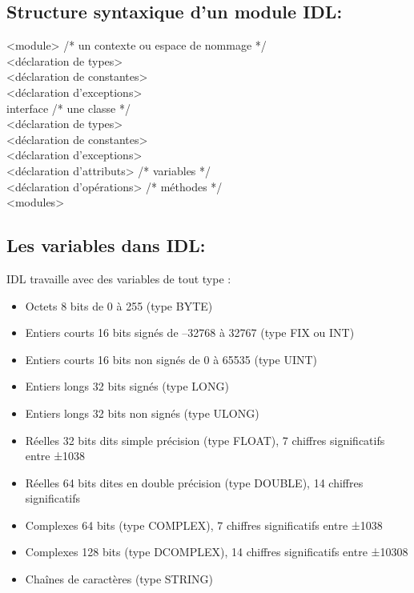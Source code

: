    \subsection{Structure syntaxique d'un module IDL:}

   <module> /* un contexte ou espace de nommage */\\

   <déclaration de types>\\
   <déclaration de constantes>\\
   <déclaration d'exceptions>\\

   interface /* une classe */\\
   <déclaration de types>\\
   <déclaration de constantes>\\
   <déclaration d'exceptions>\\

   <déclaration d'attributs> /* variables */\\
   <déclaration d'opérations> /* méthodes */\\
   <modules>\\


   \subsection{Les variables dans IDL:}
   IDL travaille avec des variables de tout type :
   \begin{itemize}[label=$\bullet$]
   \item Octets 8 bits de 0 à 255 (type BYTE)
   \item Entiers courts 16 bits signés de –32768 à 32767 (type FIX ou INT)
   \item Entiers courts 16 bits non signés de 0 à 65535 (type UINT)
   \item Entiers longs 32 bits signés (type LONG)
   \item Entiers longs 32 bits non signés (type ULONG)
   \item Réelles 32 bits dits simple précision (type FLOAT), 7 chiffres significatifs entre ±1038
   \item Réelles 64 bits dites en double précision (type DOUBLE), 14 chiffres significatifs
   \item Complexes 64 bits (type COMPLEX), 7 chiffres significatifs entre ±1038
   \item Complexes 128 bits (type DCOMPLEX), 14 chiffres significatifs entre ±10308
   \item Chaînes de caractères (type STRING)
   \end{itemize}

